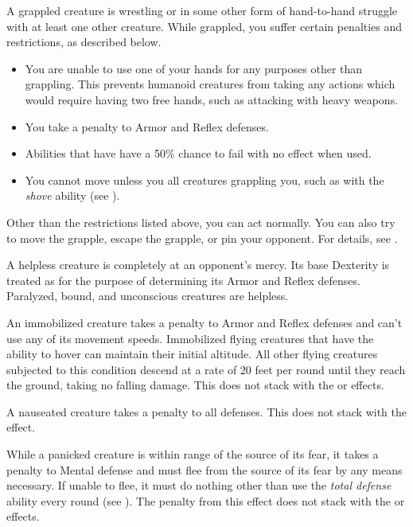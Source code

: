  A grappled creature is wrestling or in some other form of hand-to-hand struggle with at least one other creature.
While grappled, you suffer certain penalties and restrictions, as described below.
\begin{itemize}
    \item You are unable to use one of your hands for any purposes other than grappling.
        This prevents humanoid creatures from taking any actions which would require having two free hands, such as attacking with heavy weapons.
    \item You take a  penalty to Armor and Reflex defenses.
    \item Abilities that have  have a 50\% chance to fail with no effect when used.
    \item You cannot move unless you  all creatures grappling you, such as with the \textit{shove} ability (see ).
\end{itemize}

Other than the restrictions listed above, you can act normally. You can also try to move the grapple, escape the grapple, or pin your opponent. For details, see .

 A helpless creature is completely at an opponent's mercy.
Its base Dexterity is treated as  for the purpose of determining its Armor and Reflex defenses.
Paralyzed, bound, and unconscious creatures are helpless.

 An immobilized creature takes a  penalty to Armor and Reflex defenses and can't use any of its movement speeds.
Immobilized flying creatures that have the ability to hover can maintain their initial altitude.
All other flying creatures subjected to this condition descend at a rate of 20 feet per round until they reach the ground, taking no falling damage.
This does not stack with the \slowed or \decelerated effects.

 A nauseated creature takes a  penalty to all defenses.
This does not stack with the \sickened effect.

 While a panicked creature is within \rngmed range of the source of its fear, it takes a  penalty to Mental defense and must flee from the source of its fear by any means necessary.
If unable to flee, it must do nothing other than use the \textit{total defense} ability every round (see ).
The penalty from this effect does not stack with the \frightened or \panicked effects.

